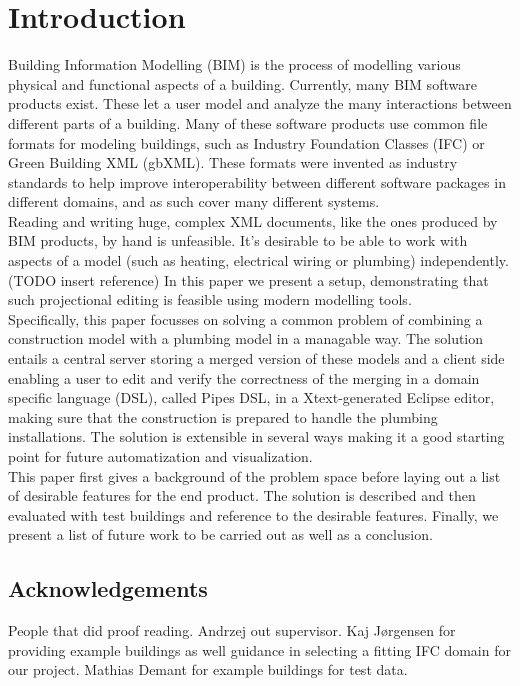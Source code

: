 


\setcounter{page}{1}
\section{Introduction}
Building Information Modelling (BIM) is the process of modelling various physical and functional aspects of a building. Currently, many BIM software products exist. These let a user model and analyze the many interactions between different parts of a building. Many of these software products use common file formats for modeling buildings, such as Industry Foundation Classes (IFC) or Green Building XML (gbXML). These formats were invented as industry standards to help improve interoperability between different software packages in different domains, and as such cover many different systems.
\\
Reading and writing huge, complex XML documents, like the ones produced by BIM products, by hand is unfeasible. It’s desirable to be able to work with aspects of a model (such as heating, electrical wiring or plumbing) independently.(TODO insert reference) In this paper we present a setup, demonstrating that such projectional editing is feasible using modern modelling tools.
\\
Specifically, this paper focusses on solving a common problem of combining a construction model with a plumbing model in a managable way. The solution entails a central server storing a merged version of these models and a client side enabling a user to edit and verify the correctness of the merging in a domain specific language (DSL), called Pipes DSL, in a Xtext-generated Eclipse editor, making sure that the construction is prepared to handle the plumbing installations. The solution is extensible in several ways making it a good starting point for future automatization and visualization.
\\
This paper first gives a background of the problem space before laying out a list of desirable features for the end product. The solution is described and then evaluated with test buildings and reference to the desirable features. Finally, we present a list of future work to be carried out as well as a conclusion.
\subsection{Acknowledgements}
People that did proof reading. Andrzej out supervisor. Kaj Jørgensen for providing example buildings as well guidance in selecting a fitting IFC domain for our project. Mathias Demant for example buildings for test data.


